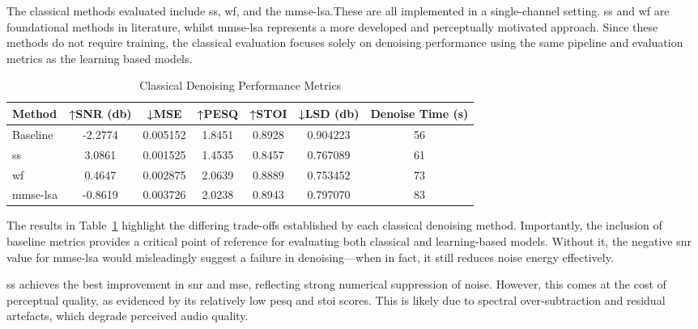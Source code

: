 The classical methods evaluated include \gls{ss}, \gls{wf}, and the \gls{mmse-lsa}.These are all implemented in a single-channel setting. \gls{ss} and \gls{wf} are foundational methods in literature, whilst \gls{mmse-lsa} represents a more developed and perceptually motivated approach. Since these methods do not require training, the classical evaluation focuses solely on denoising performance using the same pipeline and evaluation metrics as the learning based models.

\vspace{1em}
\begin{table}[H]
\centering
\caption{Classical Denoising Performance Metrics}
\label{tab:classical_metrics}
\begin{tabular}{|l|c|c|c|c|c|c|}
\hline
\textbf{Method} & \textbf{↑SNR (db)} & \textbf{↓MSE} & \textbf{↑PESQ} & \textbf{↑STOI} & \textbf{↓LSD (db)} & \textbf{Denoise Time (s)} \\
\hline
Baseline     & -2.2774 & 0.005152 & 1.8451 & 0.8928 & 0.904223 & 56 \\
\gls{ss}          & 3.0861 & 0.001525 & 1.4535 & 0.8457 & 0.767089 & 61 \\
\gls{wf}          & 0.4647 & 0.002875 & 2.0639 & 0.8889 & 0.753452 & 73 \\
\gls{mmse-lsa}    & -0.8619 & 0.003726 & 2.0238 & 0.8943 & 0.797070 & 83 \\
\hline
\end{tabular}
\end{table}

The results in Table~\ref{tab:classical_metrics} highlight the differing trade-offs established by each classical denoising method. Importantly, the inclusion of baseline metrics provides a critical point of reference for evaluating both classical and learning-based models. Without it, the negative \gls{snr} value for \gls{mmse-lsa} would misleadingly suggest a failure in denoising—when in fact, it still reduces noise energy effectively.

\gls{ss} achieves the best improvement in \gls{snr} and \gls{mse}, reflecting strong numerical suppression of noise. However, this comes at the cost of perceptual quality, as evidenced by its relatively low \gls{pesq} and \gls{stoi} scores. This is likely due to spectral over-subtraction and residual artefacts, which degrade perceived audio quality.

